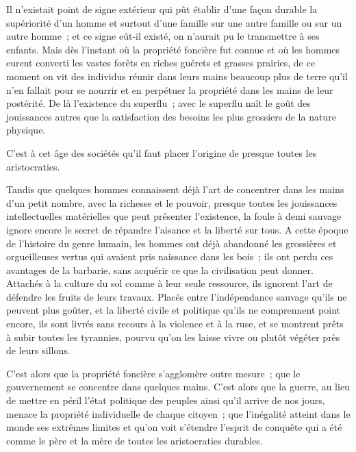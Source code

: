 \documentclass[french,twoside]{book} %
\begin{document}
\noindent Il n’existait point de signe extérieur qui pût établir d’une façon durable la supériorité d’un homme et surtout d’une famille sur une autre famille ou sur un autre homme ; et ce signe eût-il existé, on n’aurait pu le transmettre à ses enfants. Mais dès l’instant où la propriété foncière fut connue et où les hommes eurent converti les vastes forêts en riches guérets et grasses prairies, de ce moment on vit des individus réunir dans leurs mains beaucoup plus de terre qu’il n’en fallait pour se nourrir et en perpétuer la propriété dans les mains de leur postérité. De là l’existence du superflu ; avec le superflu naît le goût des jouissances autres que la satisfaction des besoins les plus grossiers de la nature physique.\par
C'est à cet âge des sociétés qu’il faut placer l’origine de presque toutes les aristocraties.\par
Tandis que quelques hommes connaissent déjà l’art de concentrer dans les mains d’un petit nombre, avec la richesse et le pouvoir, presque toutes les jouissances intellectuelles matérielles que peut présenter l’existence, la foule à demi sauvage ignore encore le secret de répandre l’aisance et la liberté sur tous. A cette époque de l’histoire du genre humain, les hommes ont déjà abandonné les grossières et orgueilleuses vertus qui avaient pris naissance dans les bois ; ils ont perdu ces avantages de la barbarie, sans acquérir ce que la civilisation peut donner. Attachés à la culture du sol comme à leur seule ressource, ils ignorent l’art de défendre les fruits de leurs travaux. Placés entre l’indépendance sauvage qu’ils ne peuvent plus goûter, et la liberté civile et politique qu’ils ne comprennent point encore, ils sont livrés sans recours à la violence et à la ruse, et se montrent prêts à subir toutes les tyrannies, pourvu qu’on les laisse vivre ou plutôt végéter près de leurs sillons.\par
C'est alors que la propriété foncière s’agglomère outre mesure ; que le gouvernement se concentre dans quelques mains. C'est alors que la guerre, au lieu de mettre en péril l’état politique des peuples ainsi qu’il arrive de nos jours, menace la propriété individuelle de chaque citoyen ; que l’inégalité atteint dans le monde ses extrêmes limites et qu’on voit s’étendre l’esprit de conquête qui a été comme le père et la mère de toutes les aristocraties durables.\par
\end{document}
